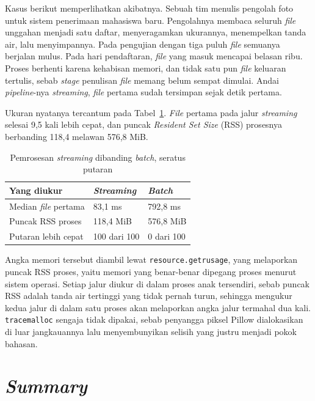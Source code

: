 Kasus berikut memperlihatkan akibatnya. Sebuah tim menulis pengolah foto untuk
sistem penerimaan mahasiswa baru. Pengolahnya membaca seluruh \textit{file} unggahan
menjadi satu daftar, menyeragamkan ukurannya, menempelkan tanda air, lalu
menyimpannya. Pada pengujian dengan tiga puluh \textit{file} semuanya berjalan mulus.
Pada hari pendaftaran, \textit{file} yang masuk mencapai belasan ribu. Proses
berhenti karena kehabisan memori, dan tidak satu pun \textit{file} keluaran
tertulis, sebab \textit{stage} penulisan \textit{file} memang belum sempat dimulai. Andai
\textit{pipeline}-nya \textit{streaming}, \textit{file} pertama sudah tersimpan
sejak detik pertama.

Ukuran nyatanya tercantum pada Tabel~\ref{tab:aliran}. \textit{File} pertama
pada jalur \textit{streaming} selesai 9,5 kali lebih cepat, dan puncak
\textit{Resident Set Size} (RSS) prosesnya berbanding 118,4 melawan 576,8 MiB.

\begin{table}[htbp]
  \centering
  \caption{Pemrosesan \textit{streaming} dibanding \textit{batch}, seratus putaran}
  \label{tab:aliran}
  \begin{tabularx}{\textwidth}{|X|l|l|}
    \hline
    \textbf{Yang diukur} & \textbf{\textit{Streaming}} & \textbf{\textit{Batch}} \\
    \hline
    Median \textit{file} pertama & 83,1 ms & 792,8 ms \\
    \hline
    Puncak RSS proses & 118,4 MiB & 576,8 MiB \\
    \hline
    Putaran lebih cepat & 100 dari 100 & 0 dari 100 \\
    \hline
  \end{tabularx}
\end{table}

Angka memori tersebut diambil lewat \texttt{resource.getrusage}, yang
melaporkan puncak RSS proses, yaitu memori yang benar-benar dipegang proses
menurut sistem operasi. Setiap jalur diukur di dalam proses anak tersendiri,
sebab puncak RSS adalah tanda air tertinggi yang tidak pernah turun, sehingga
mengukur kedua jalur di dalam satu proses akan melaporkan angka jalur termahal
dua kali. \texttt{tracemalloc} sengaja tidak dipakai, sebab penyangga piksel
Pillow dialokasikan di luar jangkauannya lalu menyembunyikan selisih yang justru
menjadi pokok bahasan.

\section{\textit{Summary}}

